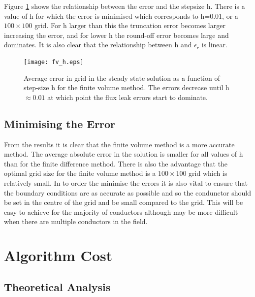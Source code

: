 \documentclass[aps,twocolumn,pre,nofootinbib,10pt]{revtex4-1}
\begin{document}
Figure \ref{fig:fv_opt} shows the relationship between the error and the stepsize h. There is a value of h for which the error is minimised which corresponds to h=0.01, or a $100 \times 100$ grid. For h larger than this the truncation error becomes larger increasing the error, and for lower h the round-off error becomes large and dominates. It is also clear that the relationship between h and \(\epsilon_r\) is linear.\footnotemark[\value{footnote}]

\begin{figure}
\texttt{[image: fv\_h.eps]}

\caption{Average error in grid in the steady state solution as a function of step-size h for the finite volume method. The errors decrease until h$\approx 0.01$ at which point the flux leak errors start to dominate.}
\label{fig:fv_opt}
\end{figure}

\subsection{Minimising the Error}

From the results it is clear that the finite volume method is a more accurate method. The average absolute error in the solution is smaller for all values of h than for the finite difference method. There is also the advantage that the optimal grid size for the finite volume method is a $100 \times 100$ grid which is relatively small.
In to order the minimise the errors it is also vital to ensure that the boundary conditions are as accurate as possible and so the condunctor should be set in the centre of the grid and be small compared to the grid. This will be easy to achieve for the majority of conductors although may be more difficult when there are multiple conductors in the field.

\section{Algorithm Cost}
\subsection{Theoretical Analysis}
\end{document}

